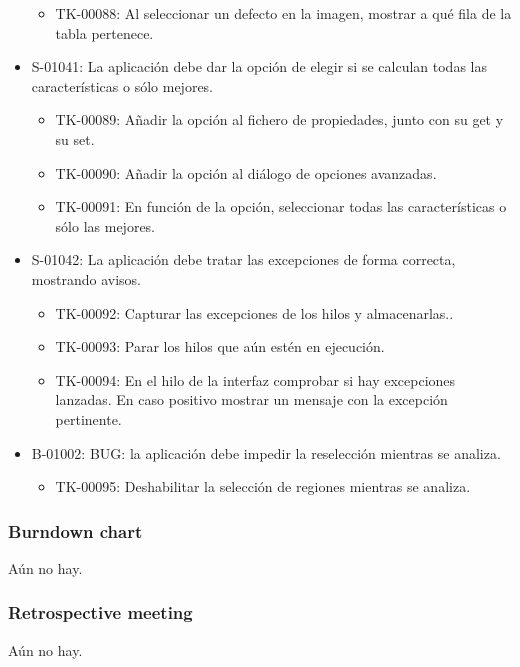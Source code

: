 \begin{itemize}
\begin{itemize}
   \item TK-00088: Al seleccionar un defecto en la imagen, mostrar a qué fila de la tabla pertenece.
  \end{itemize}
 \item S-01041: La aplicación debe dar la opción de elegir si se calculan todas las características o sólo mejores.
  \begin{itemize}
   \item TK-00089: Añadir la opción al fichero de propiedades, junto con su get y su set.
   \item TK-00090: Añadir la opción al diálogo de opciones avanzadas.
   \item TK-00091: En función de la opción, seleccionar todas las características o sólo las mejores.
  \end{itemize}
 \item S-01042: La aplicación debe tratar las excepciones de forma correcta, mostrando avisos.
  \begin{itemize}
   \item TK-00092: Capturar las excepciones de los hilos y almacenarlas..
   \item TK-00093: Parar los hilos que aún estén en ejecución.
   \item TK-00094: En el hilo de la interfaz comprobar si hay excepciones lanzadas. En caso positivo mostrar un mensaje con la excepción pertinente.
  \end{itemize}
 \item B-01002: BUG: la aplicación debe impedir la reselección mientras se analiza.
  \begin{itemize}
   \item TK-00095: Deshabilitar la selección de regiones mientras se analiza.
  \end{itemize}
\end{itemize}


\subsubsection*{Burndown chart}
Aún no hay.


\subsubsection*{Retrospective meeting}
Aún no hay.
